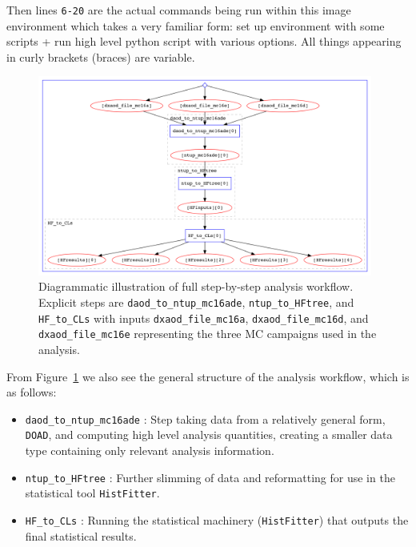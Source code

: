 Then lines \texttt{6-20} are the actual commands being run within this image environment which takes a very familiar form: set up environment with some scripts + run high level python script with various options.
All things appearing in curly brackets (braces) are variable.
\begin{figure}[ht]
  \begin{center}
    \includegraphics[width=0.98\textwidth]{figs/rpvthreel/yadage_workflow_instance.png}
  \end{center}
  \caption{Diagrammatic illustration of full step-by-step analysis workflow.
  Explicit steps are \texttt{daod\_to\_ntup\_mc16ade}, \texttt{ntup\_to\_HFtree}, and \texttt{HF\_to\_CLs} with inputs \texttt{dxaod\_file\_mc16a}, \texttt{dxaod\_file\_mc16d}, and \texttt{dxaod\_file\_mc16e} representing the three MC campaigns used in the analysis.}
  \label{fig:rpvthreel:workflow}
\end{figure}
From Figure~\ref{fig:rpvthreel:workflow} we also see the general structure of the analysis workflow, which is as follows:
\begin{itemize}
    \item \texttt{daod\_to\_ntup\_mc16ade} : Step taking data from a relatively general form, \texttt{DOAD}, and computing high level analysis quantities, creating a smaller data type containing only relevant analysis information. 
    \item \texttt{ntup\_to\_HFtree} : Further slimming of data and reformatting for use in the statistical tool \texttt{HistFitter}.
    \item \texttt{HF\_to\_CLs} : Running the statistical machinery (\texttt{HistFitter}) that outputs the final statistical results.
\end{itemize}

